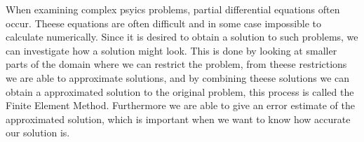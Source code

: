 When examining complex psyics problems, partial differential equations often occur. Theese equations are often difficult and in some case impossible to calculate numerically.
Since it is desired to obtain a solution to such problems, we can investigate how a solution might look. This is done by looking at smaller parts of the domain where we can restrict the problem,
from theese restrictions we are able to approximate solutions, and by combining theese solutions we can obtain a approximated solution to the original problem, this process is called the Finite Element Method.
Furthermore we are able to give an error estimate of the approximated solution, which is important when we want to know how accurate our solution is.